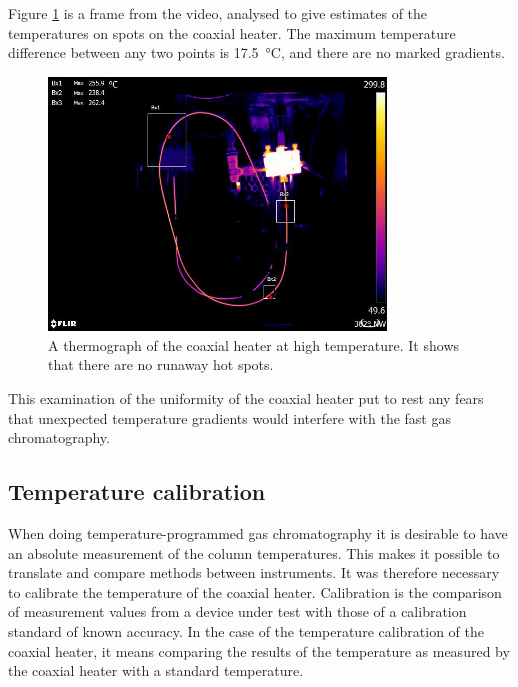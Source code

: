Figure \ref{fig:ThermalImage} is a frame from the video, analysed to give
estimates of the temperatures on spots on the coaxial heater. The maximum
temperature difference between any two points is \SI{17.5}{\celsius}, and there
are no marked gradients.

\begin{figure}
	\centering
	\includegraphics[width=0.8\textwidth]{Figures/ThermalImage}
	\decoRule
	
\caption[A thermograph of the coaxial heater at temperature]{A thermograph of
the coaxial heater at high temperature. It shows that there are no runaway hot
spots.}
	
	\label{fig:ThermalImage}
\end{figure}

This examination of the uniformity of the coaxial heater put to rest any fears
that unexpected temperature gradients would interfere with the fast gas
chromatography.

\subsection{Temperature calibration}

When doing temperature-programmed gas chromatography it is desirable to have an
absolute measurement of the column temperatures. This makes it possible to
translate and compare methods between instruments. It was therefore necessary to
calibrate the temperature of the coaxial heater. Calibration is the comparison
of measurement values from a device under test with those of a calibration
standard of known accuracy. In the case of the temperature calibration of the
coaxial heater, it means comparing the results of the temperature as measured by
the coaxial heater with a standard temperature.


